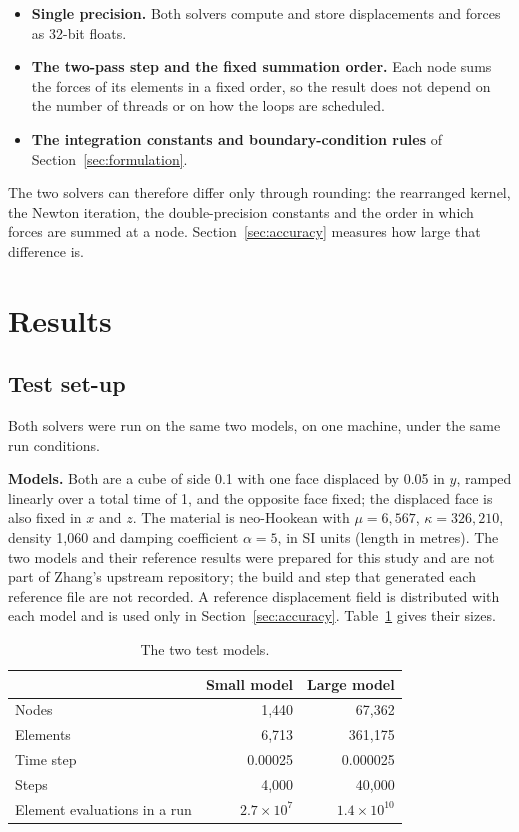 \documentclass[11pt,a4paper]{article}
\begin{document}
\begin{itemize}
\item \textbf{Single precision.} Both solvers compute and store displacements and forces as 32-bit floats.
\item \textbf{The two-pass step and the fixed summation order.} Each node sums the forces of its elements in a fixed order, so the result does not depend on the number of threads or on how the loops are scheduled.
\item \textbf{The integration constants and boundary-condition rules} of Section~\ref{sec:formulation}.
\end{itemize}
The two solvers can therefore differ only through rounding: the rearranged kernel, the Newton iteration, the double-precision constants and the order in which forces are summed at a node. Section~\ref{sec:accuracy} measures how large that difference is.

\section{Results}
\label{sec:results}

\subsection{Test set-up}
\label{sec:setup}

Both solvers were run on the same two models, on one machine, under the same run conditions.

\textbf{Models.} Both are a cube of side 0.1 with one face displaced by 0.05 in $y$, ramped linearly over a total time of 1, and the opposite face fixed; the displaced face is also fixed in $x$ and $z$. The material is neo-Hookean with $\mu = 6{,}567$, $\kappa = 326{,}210$, density 1,060 and damping coefficient $\alpha = 5$, in SI units (length in metres). The two models and their reference results were prepared for this study and are not part of Zhang's upstream repository; the build and step that generated each reference file are not recorded. A reference displacement field is distributed with each model and is used only in Section~\ref{sec:accuracy}. Table~\ref{tab:models} gives their sizes.

\begin{table}[ht]
\centering
\small
\caption{The two test models.}
\label{tab:models}
\begin{tabular}{@{}lrr@{}}
\toprule
 & Small model & Large model \\
\midrule
Nodes & 1,440 & 67,362 \\
Elements & 6,713 & 361,175 \\
Time step & 0.00025 & 0.000025 \\
Steps & 4,000 & 40,000 \\
Element evaluations in a run & $2.7\times10^{7}$ & $1.4\times10^{10}$ \\
\bottomrule
\end{tabular}
\end{table}
\end{document}
